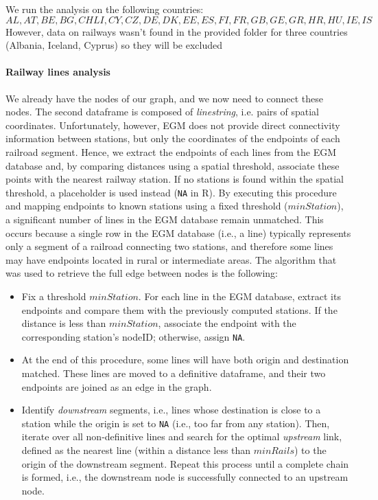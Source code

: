 We run the analysis on the following countries: 
$$
AL, AT,BE, BG,CHLI, CY,CZ,DE,DK,EE,ES,FI,FR, GB, GE, GR ,HR, HU,IE, IS
$$
However, data on railways wasn't found in the provided folder for three countries (Albania, Iceland, Cyprus) so they will be excluded


\paragraph{Railway lines analysis} We already have the nodes of our graph, and we now need to connect these nodes. The second dataframe is composed of \textit{linestring}, i.e. pairs of spatial coordinates. Unfortunately, however, EGM does not provide direct connectivity information between stations, but only the coordinates of the endpoints of each railroad segment. Hence, we extract the endpoints of each lines from the EGM database and, by comparing distances using a spatial threshold, associate these points with the nearest railway station. If no stations is found within the spatial threshold, a placeholder is used instead (\texttt{NA} in R). By executing this procedure and mapping endpoints to known stations using a fixed threshold ($minStation$), a significant number of lines in the EGM database remain unmatched. This occurs because a single row in the EGM database (i.e., a line) typically represents only a segment of a railroad connecting two stations, and therefore some lines may have endpoints located in rural or intermediate areas. The algorithm that was used to retrieve the full edge between nodes is the following:
\begin{itemize}
	\item Fix a threshold $minStation$. For each line in the EGM database, extract its endpoints and compare them with the previously computed stations. If the distance is less than $minStation$, associate the endpoint with the corresponding station's nodeID; otherwise, assign \texttt{NA}.
	\item At the end of this procedure, some lines will have both origin and destination matched. These lines are moved to a definitive dataframe, and their two endpoints are joined as an edge in the graph.
	\item Identify \textit{downstream} segments, i.e., lines whose destination is close to a station while the origin is set to \texttt{NA} (i.e., too far from any station). Then, iterate over all non-definitive lines and search for the optimal \textit{upstream} link, defined as the nearest line (within a distance less than $minRails$) to the origin of the downstream segment. Repeat this process until a complete chain is formed, i.e., the downstream node is successfully connected to an upstream node.
\end{itemize}
